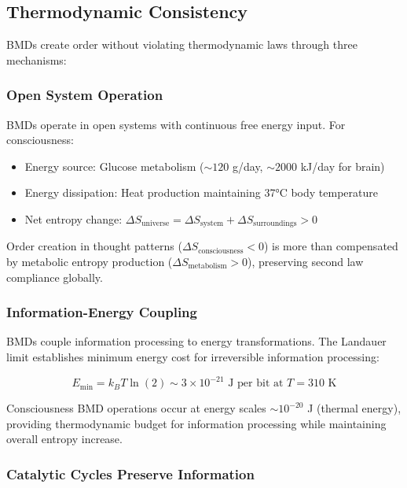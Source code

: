 \subsection{Thermodynamic Consistency}

BMDs create order without violating thermodynamic laws through three mechanisms:

\subsubsection{Open System Operation}

BMDs operate in open systems with continuous free energy input. For consciousness:

\begin{itemize}
\item Energy source: Glucose metabolism (\(\sim 120\) g/day, \(\sim 2000\) kJ/day for brain)
\item Energy dissipation: Heat production maintaining 37°C body temperature
\item Net entropy change: \(\Delta S_{\text{universe}} = \Delta S_{\text{system}} + \Delta S_{\text{surroundings}} > 0\)
\end{itemize}

Order creation in thought patterns (\(\Delta S_{\text{consciousness}} < 0\)) is more than compensated by metabolic entropy production (\(\Delta S_{\text{metabolism}} > 0\)), preserving second law compliance globally.

\subsubsection{Information-Energy Coupling}

BMDs couple information processing to energy transformations. The Landauer limit establishes minimum energy cost for irreversible information processing:

\begin{equation}
E_{\text{min}} = k_B T \ln(2) \sim 3 \times 10^{-21} \text{ J per bit at } T = 310 \text{ K}
\end{equation}

Consciousness BMD operations occur at energy scales \(\sim 10^{-20}\) J (thermal energy), providing thermodynamic budget for information processing while maintaining overall entropy increase.

\subsubsection{Catalytic Cycles Preserve Information}

